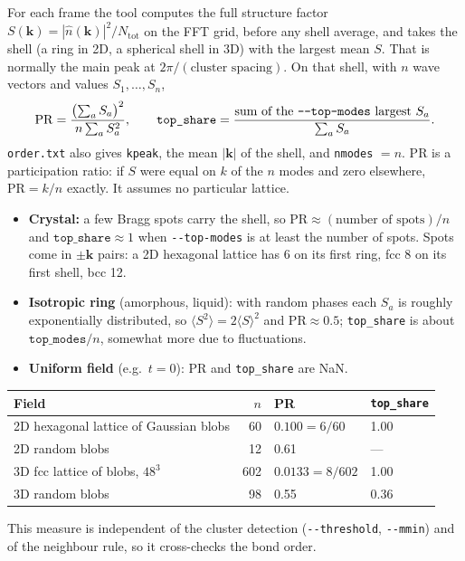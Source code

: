 \documentclass[11pt]{article}
\newcommand{\code}[1]{\texttt{#1}}
\begin{document}
For each frame the tool computes the full structure factor
$S(\mathbf k)=|\hat n(\mathbf k)|^2/N_{\mathrm{tot}}$ on the FFT grid, before
any shell average, and takes the shell (a ring in 2D, a spherical shell in 3D)
with the largest mean $S$. That is normally the main peak at
$2\pi/(\text{cluster spacing})$. On that shell, with $n$ wave vectors and values
$S_1,\dots,S_n$,
\begin{equation}
  \mathrm{PR} = \frac{\bigl(\sum_a S_a\bigr)^2}{n\sum_a S_a^2},\qquad
  \code{top\_share} = \frac{\text{sum of the \code{-{}-top-modes} largest } S_a}{\sum_a S_a}.
\end{equation}
\code{order.txt} also gives \code{kpeak}, the mean $|\mathbf k|$ of the shell,
and \code{nmodes} $=n$. PR is a participation ratio: if $S$ were equal on $k$
of the $n$ modes and zero elsewhere, $\mathrm{PR}=k/n$ exactly. It assumes no
particular lattice.
\begin{itemize}[nosep]
  \item \textbf{Crystal:} a few Bragg spots carry the shell, so
        $\mathrm{PR}\approx(\text{number of spots})/n$ and
        $\code{top\_share}\approx1$ when \code{-{}-top-modes} is at least the
        number of spots. Spots come in $\pm\mathbf k$ pairs: a 2D hexagonal
        lattice has 6 on its first ring, fcc 8 on its first shell, bcc 12.
  \item \textbf{Isotropic ring} (amorphous, liquid): with random phases each
        $S_a$ is roughly exponentially distributed, so
        $\langle S^2\rangle=2\langle S\rangle^2$ and $\mathrm{PR}\approx0.5$;
        \code{top\_share} is about $\code{top\_modes}/n$, somewhat more due to
        fluctuations.
  \item \textbf{Uniform field} (e.g.\ $t=0$): PR and \code{top\_share} are NaN.
\end{itemize}

\begin{center}
\begin{tabular}{@{}l r l l@{}}
\toprule
Field & $n$ & PR & \code{top\_share} \\
\midrule
2D hexagonal lattice of Gaussian blobs & 60 & $0.100=6/60$ & 1.00 \\
2D random blobs & 12 & 0.61 & --- \\
3D fcc lattice of blobs, $48^3$ & 602 & $0.0133=8/602$ & 1.00 \\
3D random blobs & 98 & 0.55 & 0.36 \\
\bottomrule
\end{tabular}
\end{center}
This measure is independent of the cluster detection (\code{-{}-threshold},
\code{-{}-mmin}) and of the neighbour rule, so it cross-checks the bond order.
\end{document}
